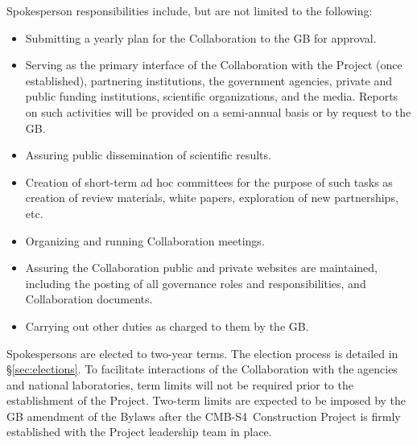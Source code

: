 \documentclass[12pt]{article}
\newcommand{\exec}{{Executive Team}}
\newcommand\collabname{CMB-S4}
\begin{document}
Spokesperson responsibilities include, but are not limited to the following: 
\begin{itemize}
\item Submitting a yearly plan for the Collaboration to the GB for approval. 
\item Serving as the primary interface of the Collaboration with the Project (once established), partnering institutions, the government agencies, private and public funding institutions, scientific organizations, and the media. Reports on such activities will be provided on a semi-annual basis or by request to the GB.
\item Assuring public dissemination of scientific results. 
\item Creation of short-term ad hoc committees for the purpose of such tasks as creation of review materials, white papers, exploration of new partnerships, etc.
\item Organizing and running Collaboration meetings. 

\item Assuring the Collaboration public and private websites are maintained, including the posting of all governance roles and responsibilities, and Collaboration documents. 

\item Carrying out other duties as charged to them by the GB. 



\end{itemize}

Spokespersons are elected to two-year terms. The election process is detailed in \S\ref{sec:elections}.   To facilitate interactions of the Collaboration with the agencies and national laboratories, term limits will not be required prior to the establishment of the Project.  Two-term limits are expected to be imposed by the GB amendment of the Bylaws after the \collabname\ Construction Project is firmly established with the Project leadership team in place. 
\end{document}
